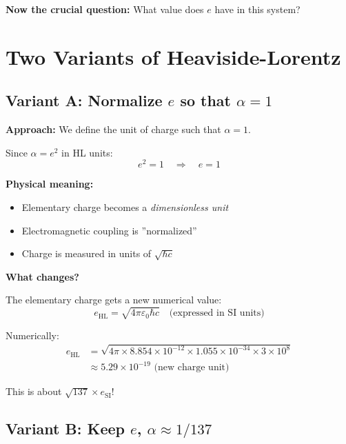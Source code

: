 	\textbf{Now the crucial question:} What value does $e$ have in this system?
	
	\section[Two Variants of Heaviside-Lorentz]{Two Variants of Heaviside-Lorentz}
	
	\subsection[Variant A]{Variant A: Normalize $e$ so that $\alpha = 1$}
	
	\textbf{Approach:} We define the unit of charge such that $\alpha = 1$.
	
	Since $\alpha = e^2$ in HL units:
	\begin{equation}
		e^2 = 1 \quad \Rightarrow \quad e = 1
	\end{equation}
	
	\textbf{Physical meaning:}
	\begin{itemize}
		\item Elementary charge becomes a \textit{dimensionless unit}
		\item Electromagnetic coupling is ''normalized''
		\item Charge is measured in units of $\sqrt{\hbar c}$
	\end{itemize}
	
	\textbf{What changes?}
	
	The elementary charge gets a new numerical value:
	\begin{equation}
		e_{\text{HL}} = \sqrt{4\pi\varepsilon_0\hbar c} \quad \text{(expressed in SI units)}
	\end{equation}
	
	Numerically:
	\begin{align}
		e_{\text{HL}} &= \sqrt{4\pi \times 8.854 \times 10^{-12} \times 1.055 \times 10^{-34} \times 3 \times 10^8} \\
		&\approx 5.29 \times 10^{-19} \text{ (new charge unit)}
	\end{align}
	
	This is about $\sqrt{137} \times e_{\text{SI}}$!
	
	\subsection{Variant B: Keep $e$, $\alpha \approx 1/137$}
	
